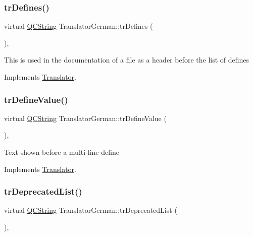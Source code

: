 \subsubsection{\texorpdfstring{trDefines()}{trDefines()}}
{\footnotesize\ttfamily virtual \mbox{\hyperlink{class_q_c_string}{Q\+C\+String}} Translator\+German\+::tr\+Defines (\begin{DoxyParamCaption}{ }\end{DoxyParamCaption})\hspace{0.3cm}{\ttfamily [inline]}, {\ttfamily [virtual]}}

This is used in the documentation of a file as a header before the list of defines 

Implements \mbox{\hyperlink{class_translator}{Translator}}.

\mbox{\label{class_translator_german_a0a8974569143d2e83ecfdc13f2662f0d}} 
\subsubsection{\texorpdfstring{trDefineValue()}{trDefineValue()}}
{\footnotesize\ttfamily virtual \mbox{\hyperlink{class_q_c_string}{Q\+C\+String}} Translator\+German\+::tr\+Define\+Value (\begin{DoxyParamCaption}{ }\end{DoxyParamCaption})\hspace{0.3cm}{\ttfamily [inline]}, {\ttfamily [virtual]}}

Text shown before a multi-\/line define 

Implements \mbox{\hyperlink{class_translator}{Translator}}.

\mbox{\label{class_translator_german_a78d9ff50d6dbda0b47f71bf2721c6a2d}} 
\subsubsection{\texorpdfstring{trDeprecatedList()}{trDeprecatedList()}}
{\footnotesize\ttfamily virtual \mbox{\hyperlink{class_q_c_string}{Q\+C\+String}} Translator\+German\+::tr\+Deprecated\+List (\begin{DoxyParamCaption}{ }\end{DoxyParamCaption})\hspace{0.3cm}{\ttfamily [inline]}, {\ttfamily [virtual]}}

